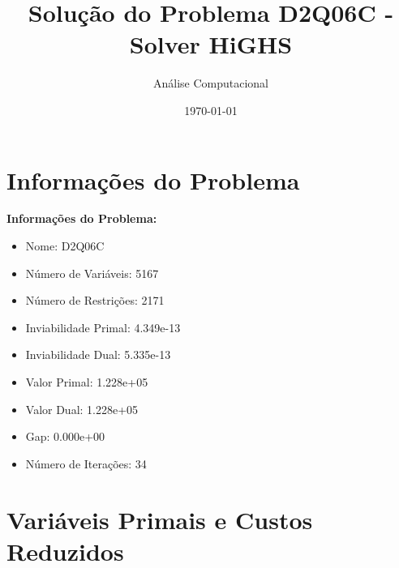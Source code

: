 \documentclass[12pt]{article}
\title{Solução do Problema D2Q06C - Solver HiGHS}
\author{Análise Computacional}
\date{\today}
\begin{document}
\maketitle

\section{Informações do Problema}

\textbf{Informações do Problema:}
\begin{itemize}
\item Nome: D2Q06C
\item Número de Variáveis: 5167
\item Número de Restrições: 2171
\item Inviabilidade Primal: 4.349e-13
\item Inviabilidade Dual: 5.335e-13
\item Valor Primal: 1.228e+05
\item Valor Dual: 1.228e+05
\item Gap: 0.000e+00
\item Número de Iterações: 34
\end{itemize}


\section{Variáveis Primais e Custos Reduzidos}
\end{document}

